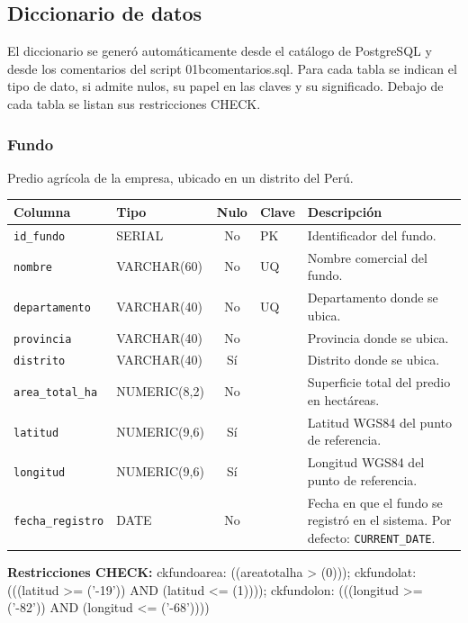 \documentclass[11pt,letterpaper]{article}
\newcommand{\tbus}{\textunderscore\allowbreak}
\newcommand{\tb}[1]{{\ttfamily\let\_\tbus #1}}
\begin{document}
\subsection{Diccionario de datos}

El diccionario se generó automáticamente desde el catálogo de PostgreSQL y desde los comentarios del script \tb{01b\_comentarios.sql}. Para cada tabla se indican el tipo de dato, si admite nulos, su papel en las claves y su significado. Debajo de cada tabla se listan sus restricciones \tb{CHECK}.

\subsubsection*{Fundo}
Predio agrícola de la empresa, ubicado en un distrito del Perú.
{\footnotesize
\begin{longtable}{>{\raggedright\arraybackslash}p{3.3cm}>{\raggedright\arraybackslash}p{2.5cm}c>{\raggedright\arraybackslash}p{2.2cm}>{\raggedright\arraybackslash}p{6.1cm}}
\toprule
\textbf{Columna} & \textbf{Tipo} & \textbf{Nulo} & \textbf{Clave} & \textbf{Descripción} \\
\midrule
\endhead
\texttt{id\_fundo} & SERIAL & No & PK & Identificador del fundo. \\
\texttt{nombre} & VARCHAR(60) & No & UQ & Nombre comercial del fundo. \\
\texttt{departamento} & VARCHAR(40) & No & UQ & Departamento donde se ubica. \\
\texttt{provincia} & VARCHAR(40) & No &  & Provincia donde se ubica. \\
\texttt{distrito} & VARCHAR(40) & Sí &  & Distrito donde se ubica. \\
\texttt{area\_total\_ha} & NUMERIC(8,2) & No &  & Superficie total del predio en hectáreas. \\
\texttt{latitud} & NUMERIC(9,6) & Sí &  & Latitud WGS84 del punto de referencia. \\
\texttt{longitud} & NUMERIC(9,6) & Sí &  & Longitud WGS84 del punto de referencia. \\
\texttt{fecha\_registro} & DATE & No &  & Fecha en que el fundo se registró en el sistema. Por defecto: \texttt{CURRENT\_DATE}. \\
\bottomrule
\end{longtable}}
{\footnotesize\textbf{Restricciones CHECK:} \tb{ck\_fundo\_area}: \tb{((area\_total\_ha > (0)))}; \tb{ck\_fundo\_lat}: \tb{(((latitud >= ('-19')) AND (latitud <= (1))))}; \tb{ck\_fundo\_lon}: \tb{(((longitud >= ('-82')) AND (longitud <= ('-68'))))}\par}
\medskip
\end{document}
